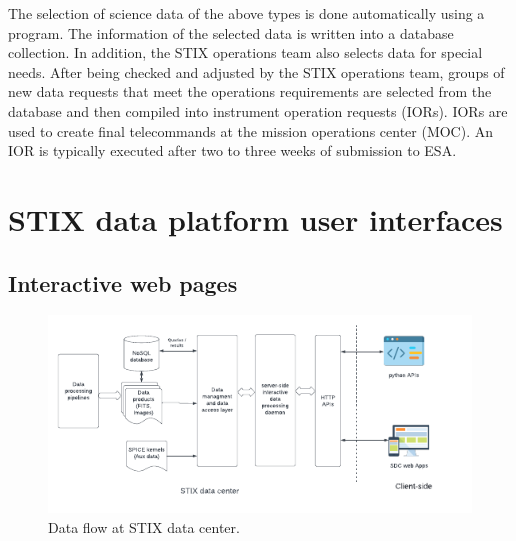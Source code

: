 \documentclass[referee]{aa} %
\begin{document}
The selection of science data of the above types is done automatically using a program. The information of the selected data is written into a database collection.  In addition, the STIX operations team also selects data for special 
needs.  After being checked and adjusted by the STIX operations team, groups of new data requests that meet the operations requirements are selected from the database and then compiled into instrument operation requests (IORs). 
IORs are used to create final telecommands at the mission operations center (MOC). An IOR is typically executed after two to three weeks of submission to ESA. 

\section{STIX data platform user interfaces}
\subsection{Interactive web pages}
\begin{figure}[ht]
  \centering
  \includegraphics[width=0.9\linewidth]{figures/interfaces.pdf}
  \caption{ 
    Data flow at STIX data center.
  }
  \label{fig:interfaces}
\end{figure}
\end{document}
